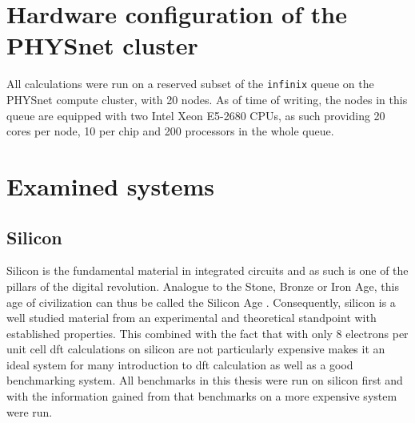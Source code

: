 \documentclass[main.tex]{subfiles}
\begin{document}

\section{Hardware configuration of the PHYSnet cluster}\label{sec:hardware_physnet}

All calculations were run on a reserved subset of the \texttt{infinix} queue on the PHYSnet compute cluster, with 20 nodes.
As of time of writing, the nodes in this queue are equipped with two Intel Xeon E5-2680 CPUs, as such providing 20 cores per node, 10 per chip and 200 processors in the whole queue.



\section{Examined systems}\label{sec:examined_systems}

\subsection{Silicon}\label{sub:systems_silicon}

Silicon is the fundamental material in integrated circuits and as such is one of the pillars of the digital revolution.
Analogue to the Stone, Bronze or Iron Age, this age of civilization can thus be called the Silicon Age \cite{chabal_fundamental_2001}.
Consequently, silicon is a well studied material from an experimental and theoretical standpoint with established properties.
This combined with the fact that with only 8 electrons per unit cell \acrshort{dft} calculations on silicon are not particularly expensive makes it an ideal system for many introduction to \acrshort{dft} calculation as well as a good benchmarking system.
All benchmarks in this thesis were run on silicon first and with the information gained from that benchmarks on a more expensive system were run.
\end{document}
